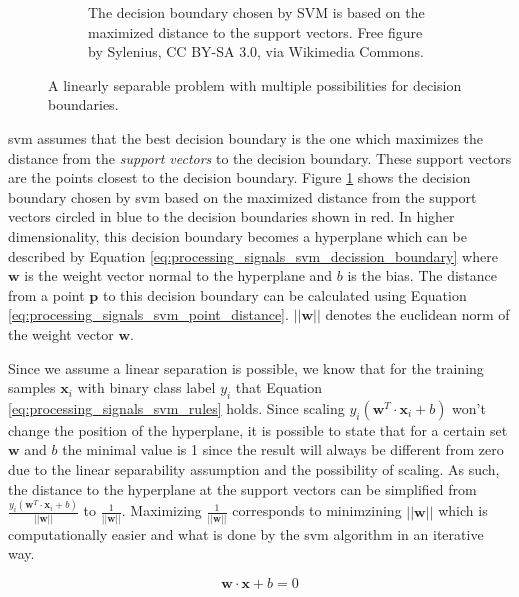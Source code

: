 \begin{figure}[t]
\begin{subfigure}{0.45\textwidth}
        \captionsetup{width=\linewidth}
        \captionsetup{justification=centering}
        \caption{The decision boundary chosen by SVM is based on the maximized distance to the support vectors. Free figure by Sylenius, CC BY-SA 3.0, via Wikimedia Commons.}
        \label{fig:processing_signals_svm_boundary_best}
    \end{subfigure}
    \captionsetup{width=\linewidth}
    \captionsetup{justification=centering}
    \caption{A linearly separable problem with multiple possibilities for decision boundaries.}
    \label{fig:processing_signals_svm_boundary}
\end{figure}


\Gls{svm} assumes that the best decision boundary is the one which maximizes the distance from the \textit{support vectors} to the decision boundary.
These support vectors are the points closest to the decision boundary.
Figure \ref{fig:processing_signals_svm_boundary_best} shows the decision boundary chosen by \gls{svm} based on the maximized distance from the support vectors circled in blue to the decision boundaries shown in red.
In higher dimensionality, this decision boundary becomes a hyperplane which can be described by Equation \ref{eq:processing_signals_svm_decission_boundary} where $\mathbf{w}$ is the weight vector normal to the hyperplane and $b$ is the bias.
The distance from a point $\mathbf{p}$ to this decision boundary can be calculated using Equation \ref{eq:processing_signals_svm_point_distance}.
$||\mathbf{w}||$ denotes the euclidean norm of the weight vector $\mathbf{w}$.

Since we assume a linear separation is possible, we know that for the training samples $\mathbf{x}_i$ with binary class label $y_i$ that Equation \ref{eq:processing_signals_svm_rules} holds.
Since scaling $y_i (\mathbf{w}^T \cdot \mathbf{x}_i + b)$ won't change the position of the hyperplane, it is possible to state that for a certain set $\mathbf{w}$ and $b$ the minimal value is 1 since the result will always be different from zero due to the linear separability assumption and the possibility of scaling.
As such, the distance to the hyperplane at the support vectors can be simplified from $\frac{y_i (\mathbf{w}^T \cdot \mathbf{x}_i + b)}{||\mathbf{w}||}$ to $\frac{1}{||\mathbf{w}||}$.
Maximizing $\frac{1}{||\mathbf{w}||}$ corresponds to minimzining $||\mathbf{w}||$ which is computationally easier and what is done by the \gls{svm} algorithm in an iterative way.


\begin{equation}
    \label{eq:processing_signals_svm_decission_boundary}
    \mathbf{w} \cdot \mathbf{x} + b = 0
\end{equation}


